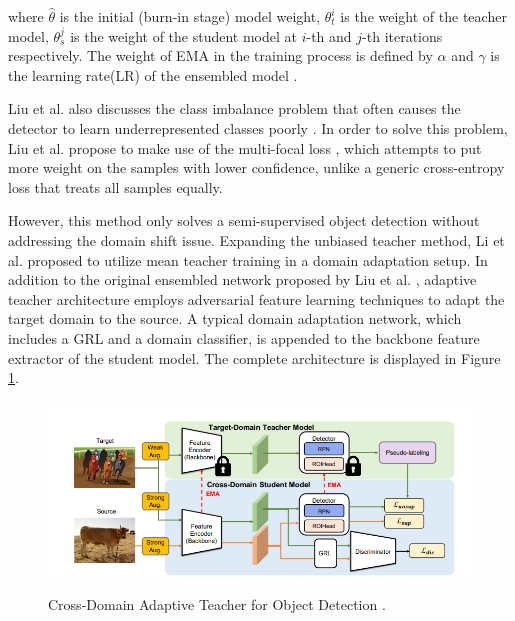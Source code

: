 \documentclass[english, 12pt, a4paper, elec, utf8, a-1b, online]{aaltothesis}
\begin{document}
where $\hat{\theta}$ is the initial (burn-in stage) model weight, $\theta_{t}^{i}$ is the weight of the teacher model, $\theta_{s}^{j}$ is the weight of the student model  at $i$-th and $j$-th iterations respectively. The weight of EMA in the training process is defined by $\alpha$ and $\gamma$ is the learning rate(LR) of the ensembled model \cite{Liu2021}.

Liu et al. also discusses the class imbalance problem that often causes the detector to learn underrepresented classes poorly \cite{Liu2021}. In order to solve this problem, Liu et al. propose to make use of the multi-focal loss \cite{Lin2017}, which attempts to put more weight on the samples with lower confidence, unlike a generic cross-entropy loss that treats all samples equally. 

However, this method only solves a semi-supervised object detection without addressing the domain shift issue. Expanding the unbiased teacher method, Li et al. \cite{Li2021} proposed to utilize mean teacher training in a domain adaptation setup. In addition to the original ensembled network proposed by Liu et al.  \cite{Liu2021}, adaptive teacher architecture employs adversarial feature learning techniques to adapt the target domain to the source. A typical domain adaptation network, which includes a GRL and a domain classifier, is appended to the backbone feature extractor of the student model. The complete architecture is displayed in Figure \ref{adapt_teacher}. 
 
\begin{figure}[htb]
	\begin{center}
		\includegraphics[width=16cm]{./adapt_teacher.png}
	\end{center}
	\caption{Cross-Domain Adaptive Teacher for Object Detection
\cite{Li2021}.}
	\begin{center}
		\label{adapt_teacher}
	\end{center}
\end{figure}
\FloatBarrier
\end{document}

